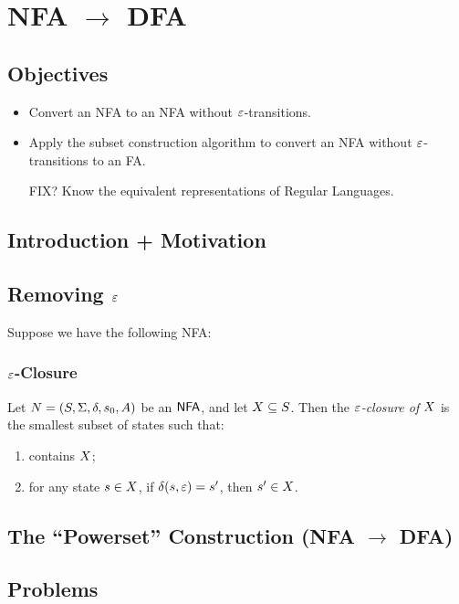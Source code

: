 \chapter{NFA $\to$ DFA}

\section{Objectives}

\begin{itemize}
	\item Convert an NFA to an NFA without $\varepsilon$-transitions.
	\item Apply the subset construction algorithm to convert an NFA without $\varepsilon$-transitions to an FA.
	\item [FIX?] Know the equivalent representations of Regular Languages.
\end{itemize}

\section{Introduction + Motivation}

\section{Removing $\varepsilon$}

Suppose we have the following NFA:


\subsection{$\varepsilon$-Closure}

\begin{definition}
	Let $N = (S, \Sigma, \delta, s_0, A)$ be an $\textsf{NFA}$, and let $X \subseteq S$.
	Then the \emph{$\varepsilon$-closure of $X$} is the smallest subset of states such that:
	\begin{enumerate}
		\item contains $X$;
		\item for any state $s \in X$, if $\delta(s, \varepsilon) = s'$, then $s' \in X$.
	\end{enumerate}
\end{definition}

\section{The ``Powerset'' Construction (NFA $\to$ DFA)}



\section{Problems}
